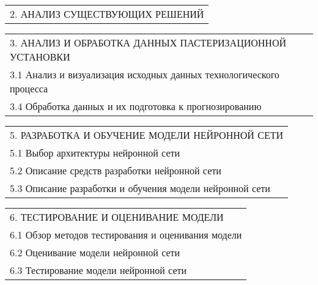 \documentclass[12pt, А4, twoside]{article} %
\begin{document}
\begin{FlushLeft}
    \begin{tabular}{p{17.25cm}} 
        \hspace{0.3cm} \textsf{2. АНАЛИЗ СУЩЕСТВУЮЩИХ РЕШЕНИЙ} \vspace{1pt} \hline \\
    \end{tabular} 

    \begin{tabular}{p{17.25cm}} 
        \hspace{0.3cm} \textsf{3. АНАЛИЗ И ОБРАБОТКА ДАННЫХ ПАСТЕРИЗАЦИОННОЙ УСТАНОВКИ} \vspace{1pt} \hline \\
        \hspace{0.6cm} \textsf{3.1 Анализ и визуализация исходных данных технологического процесса} \vspace{1pt} \hline \\
        \hspace{0.6cm} \textsf{3.4 Обработка данных и их подготовка к прогнозированию} \vspace{1pt} \hline \\
    \end{tabular}    

    \begin{tabular}{p{17.25cm}} 
        \hspace{0.3cm} \textsf{5. РАЗРАБОТКА И ОБУЧЕНИЕ МОДЕЛИ НЕЙРОННОЙ СЕТИ} \vspace{1pt} \hline \\
        \hspace{0.6cm} \textsf{5.1 Выбор архитектуры нейронной сети} \vspace{1pt} \hline \\
        \hspace{0.6cm} \textsf{5.2 Описание средств разработки нейронной сети} \vspace{1pt} \hline \\
        \hspace{0.6cm} \textsf{5.3 Описание разработки и обучения модели нейронной сети} \vspace{1pt} \hline \\
    \end{tabular}  

    \begin{tabular}{p{17.25cm}} 
        \hspace{0.3cm} \textsf{6. ТЕСТИРОВАНИЕ И ОЦЕНИВАНИЕ МОДЕЛИ} \vspace{1pt} \hline \\
        \hspace{0.6cm} \textsf{6.1 Обзор методов тестирования и оценивания модели} \vspace{1pt} \hline \\
        \hspace{0.6cm} \textsf{6.2 Оценивание модели нейронной сети} \vspace{1pt} \hline \\
        \hspace{0.6cm} \textsf{6.3 Тестирование модели нейронной сети} \vspace{1pt} \hline \\
    \end{tabular} 


\end{FlushLeft}
\end{document}
